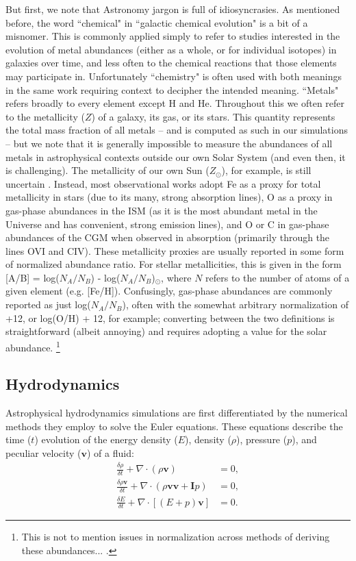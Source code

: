 But first, we note that Astronomy jargon is full of idiosyncrasies. As mentioned before, the word ``chemical" in ``galactic chemical evolution" is a bit of a misnomer. This is commonly applied simply to refer to studies interested in the evolution of metal abundances (either as a whole, or for individual isotopes) in galaxies over time, and less often to the chemical reactions that those elements may participate in. Unfortunately ``chemistry" is often used with both meanings in the same work requiring context to decipher the intended meaning. ``Metals" refers broadly to every element except H and He. Throughout this \dissertation we often refer to the metallicity ($Z$) of a galaxy, its gas, or its stars. This quantity represents the total mass fraction of all metals -- and is computed as such in our simulations -- but we note that it is generally impossible to measure the abundances of all metals in astrophysical contexts outside our own Solar System (and even then, it is challenging). The metallicity of our own Sun ($Z_{\odot}$), for example, is still uncertain \citep{Asplund2009}. Instead, most observational works adopt Fe as a proxy for total metallicity in stars (due to its many, strong absorption lines), O as a proxy in gas-phase abundances in the ISM (as it is the most abundant metal in the Universe and has convenient, strong emission lines), and O or C in gas-phase abundances of the CGM when observed in absorption (primarily through the lines OVI and CIV). These metallicity proxies are usually reported in some form of normalized abundance ratio. For stellar metallicities, this is given in the form [A/B] = log($N_A / N_B$) - log($N_A / N_B$)$_{\odot}$, where $N$ refers to the number of atoms of a given element (e.g. [Fe/H]). Confusingly, gas-phase abundances are commonly reported as just log($N_A / N_B$), often with the somewhat arbitrary normalization of +12, or log(O/H) + 12, for example; converting between the two definitions is straightforward (albeit annoying) and requires adopting a value for the solar abundance. \footnote{This is not to mention issues in normalization across methods of deriving these abundances... \citep[e.g.][]{KewleyEllison2008}.}

\subsection{Hydrodynamics}
\label{intro:sec:hydrodynamics}

Astrophysical hydrodynamics simulations are first differentiated by the numerical methods they employ to solve the Euler equations. These equations describe the time ($t$) evolution of the energy density ($E$), density ($\rho$), pressure ($p$), and peculiar velocity ($\bm{v}$) of a fluid:
\begin{align}
  \frac{\delta \rho}{\delta t} + \nabla \cdot \left(\rho \bm{v}\right)  &= 0,\\
  \frac{\delta \rho \bm{v}}{\delta t} + \nabla \cdot \left(\rho \bm{v}\bm{v} + \bm{I}p \right) &= 0,\\
  \frac{\delta E}{\delta t} + \nabla \cdot \left[\left(E +p\right)\bm{v}\right] &= 0.
\end{align}

